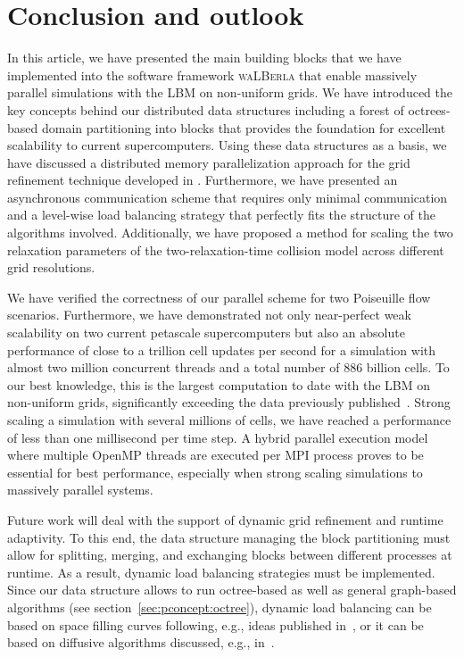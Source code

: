 \documentclass[final,leqno,onefignum,onetabnum]{siamltex1213}
\newcommand{\Walberla}{\textsc{waLBerla}}
\begin{document}
\section{Conclusion and outlook}\label{sec:conclusion}

In this article, we have presented the main building blocks that we have implemented into the software framework \Walberla{} 
that enable massively parallel simulations with the LBM on non-uniform grids.
We have introduced the key concepts behind our distributed data structures including a forest of octrees-based domain partitioning into blocks that
provides the foundation for excellent scalability to current supercomputers.
Using these data structures as a basis, we have discussed a distributed memory parallelization approach for the grid refinement technique developed in \cite{Rohde2006}.
Furthermore, we have presented an asynchronous communication scheme that requires only minimal communication and
a level-wise load balancing strategy that perfectly fits the structure of the algorithms involved.
Additionally, we have proposed a method for scaling the two relaxation parameters of the two-relaxation-time collision model across different grid resolutions.

We have verified the correctness of our parallel scheme for two Poiseuille flow scenarios.
Furthermore, we have demonstrated not only near-perfect weak scalability on two current petascale supercomputers but also
an absolute performance of close to a trillion cell updates per second
for a simulation with almost two million concurrent threads and a total number of 886 billion cells.
To our best knowledge, this is the largest computation to date with the LBM on non-uniform grids,
significantly exceeding the data previously published~\cite{Freudiger08,Schoenherr20113730,FLD:FLD2469,Hasert2014784}.
Strong scaling a simulation with several millions of cells, we have reached a performance of less than one millisecond per time step.
A hybrid parallel execution model where multiple OpenMP threads are executed per MPI process
proves to be essential for best performance, especially when strong scaling simulations to massively parallel systems.

Future work will deal with the support of dynamic grid refinement and runtime adaptivity.
To this end, the data structure managing the block partitioning must allow for splitting, merging, and exchanging blocks between different processes at runtime.
As a result, dynamic load balancing strategies must be implemented.
Since our data structure allows to run octree-based as well as general graph-based algorithms (see section~\ref{sec:pconcept:octree}),
dynamic load balancing can be based on space filling curves following, e.g., ideas published in~\cite{Burstedde2011},
or it can be based on diffusive algorithms discussed, e.g., in~\cite{4536237,5395240}.
\end{document}
